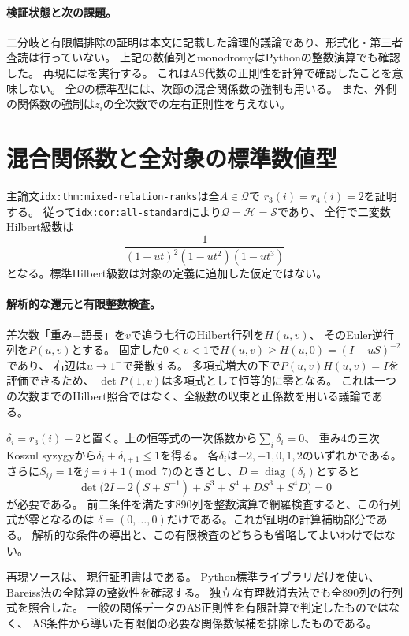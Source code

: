 \documentclass[11pt,a4paper]{ltjsarticle}
\begin{document}
\paragraph{検証状態と次の課題。}
二分岐と有限幅排除の証明は本文に記載した論理的議論であり、形式化・第三者査読は行っていない。
上記の数値列とmonodromyはPythonの整数演算でも確認した。
再現にはを実行する。
これはAS代数の正則性を計算で確認したことを意味しない。
全$\mathcal Q$の標準型には、次節の混合関係数の強制も用いる。
また、外側の関係数の強制は$z_i$の全次数での左右正則性を与えない。

\section{混合関係数と全対象の標準数値型}
主論文\texttt{idx:thm:mixed-relation-ranks}は全$A\in\mathcal Q$で
$r_3(i)=r_4(i)=2$を証明する。
従って\texttt{idx:cor:all-standard}により$\mathcal Q=\mathcal H=\mathcal S$であり、
全行で二変数Hilbert級数は
\[
\frac{1}{(1-ut)^2(1-ut^2)(1-ut^3)}
\]
となる。標準Hilbert級数は対象の定義に追加した仮定ではない。

\paragraph{解析的な還元と有限整数検査。}
差次数「重み$-$語長」を$v$で追う七行のHilbert行列を$H(u,v)$、
そのEuler逆行列を$P(u,v)$とする。
固定した$0<v<1$で$H(u,v)\geq H(u,0)=(I-uS)^{-2}$であり、
右辺は$u\to1^-$で発散する。
多項式増大の下で$P(u,v)H(u,v)=I$を評価できるため、
$\det P(1,v)$は多項式として恒等的に零となる。
これは一つの次数までのHilbert照合ではなく、全級数の収束と正係数を用いる議論である。

$\delta_i=r_3(i)-2$と置く。上の恒等式の一次係数から$\sum_i\delta_i=0$、
重み4の三次Koszul syzygyから$\delta_i+\delta_{i+1}\leq1$を得る。
各$\delta_i$は$-2,-1,0,1,2$のいずれかである。
さらに$S_{ij}=1$を$j=i+1\pmod7$のときとし、$D=\operatorname{diag}(\delta_i)$とすると
\[
\det\bigl(2I-2(S+S^{-1})+S^3+S^4+DS^3+S^4D\bigr)=0
\]
が必要である。
前二条件を満たす890列を整数演算で網羅検査すると、この行列式が零となるのは
$\delta=(0,\ldots,0)$だけである。これが証明の計算補助部分である。
解析的な条件の導出と、この有限検査のどちらも省略してよいわけではない。

再現ソースは、
現行証明書はである。
Python標準ライブラリだけを使い、Bareiss法の全除算の整数性を確認する。
独立な有理数消去法でも全890列の行列式を照合した。
一般の関係データのAS正則性を有限計算で判定したものではなく、
AS条件から導いた有限個の必要な関係数候補を排除したものである。
\end{document}
